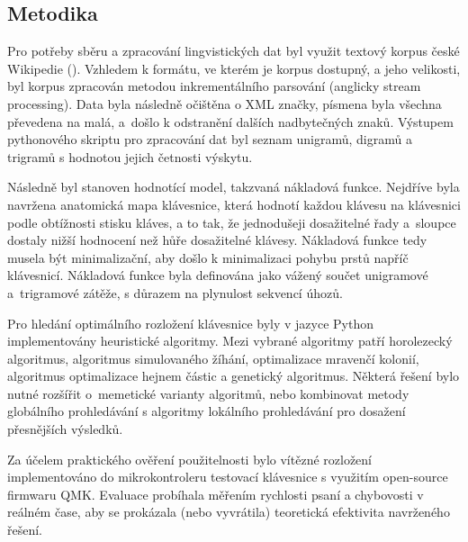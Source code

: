 \documentclass[a4paper, twoside, 12pt, czech]{article}
\begin{document}
\subsection{Metodika}


Pro potřeby sběru a zpracování lingvistických dat byl využit textový korpus české 
Wikipedie (\cite{wikidump}). Vzhledem k formátu, ve kterém je korpus dostupný, a jeho velikosti, 
byl korpus zpracován metodou inkrementálního parsování (anglicky stream processing).
Data byla následně očištěna o XML značky, písmena byla všechna převedena na malá,
a~došlo k odstranění dalších nadbytečných znaků. Výstupem pythonového skriptu pro 
zpracování dat byl seznam unigramů, digramů a trigramů s hodnotou jejich četnosti 
výskytu.

Následně byl stanoven hodnotící model, takzvaná nákladová funkce. Nejdříve byla 
navržena anatomická mapa klávesnice, která hodnotí každou klávesu na klá\-vesnici 
podle obtížnosti stisku kláves, a to tak, že jednodušeji dosažitelné řady a~sloupce 
dostaly nižší hodnocení než hůře dosažitelné klávesy. Nákladová funkce tedy 
musela být minimalizační, aby došlo k minimalizaci pohybu prstů napříč klávesnicí.
Nákladová funkce byla definována jako vážený součet unigramové a~trigramové zátěže,
s důrazem na plynulost sekvencí úhozů.

Pro hledání optimálního rozložení klávesnice byly v jazyce Python implementovány 
heuristické algoritmy. Mezi vybrané algoritmy patří horolezecký algoritmus, 
algoritmus simulovaného žíhání, optimalizace mravenčí kolonií, algoritmus optimalizace 
hejnem částic a genetický algoritmus. %
Některá řešení bylo nutné rozšířit o~memetické varianty algoritmů, 
nebo kombinovat metody globálního prohledávání s algoritmy lokálního prohledávání 
pro dosažení přesnějších výsledků.

Za účelem praktického ověření použitelnosti bylo vítězné rozložení implementováno 
do mikrokontroleru testovací klávesnice s využitím open-source firmwaru QMK. Evaluace 
probíhala měřením rychlosti psaní a chybovosti v reálném čase, aby se prokázala 
(nebo vyvrátila) teoretická efektivita navrženého řešení.
\end{document}

